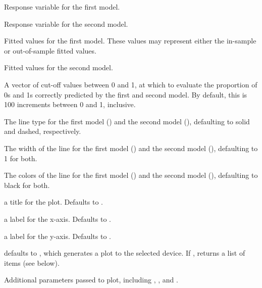 \begin{Arguments}
\begin{ldescription}
\item[\code{y1}] Response variable for the first model.
\item[\code{y2}] Response variable for the second model.
\item[\code{fitted1}] Fitted values for the first model.  These values
may represent either the in-sample or out-of-sample fitted values.
\item[\code{fitted2}] Fitted values for the second model.
\item[\code{cutoff}] A vector of cut-off values between 0 and 1, at
which to evaluate the proportion of 0s and 1s correctly predicted by
the first and second model.  By default, this is 100 increments
between 0 and 1, inclusive.
\item[\code{lty1, lty2}] The line type for the first model () and
the second model (), defaulting to solid and dashed,
respectively.
\item[\code{lwd1, lwd2}] The width of the line for the first model
() and the second model (), defaulting to 1 for both.
\item[\code{col1, col2}] The colors of the line for the first
model () and the second model (), defaulting to
black for both.
\item[\code{main}] a title for the plot.  Defaults to .
\item[\code{xlab}] a label for the x-axis.  Defaults to .
\item[\code{ylab}] a label for the y-axis.  Defaults to .
\item[\code{plot}] defaults to , which generates a plot to the
selected device.  If , returns a list of
items (see below).
\item[\code{...}] Additional parameters passed to plot, including
, , and .  
\end{ldescription}
\end{Arguments}
